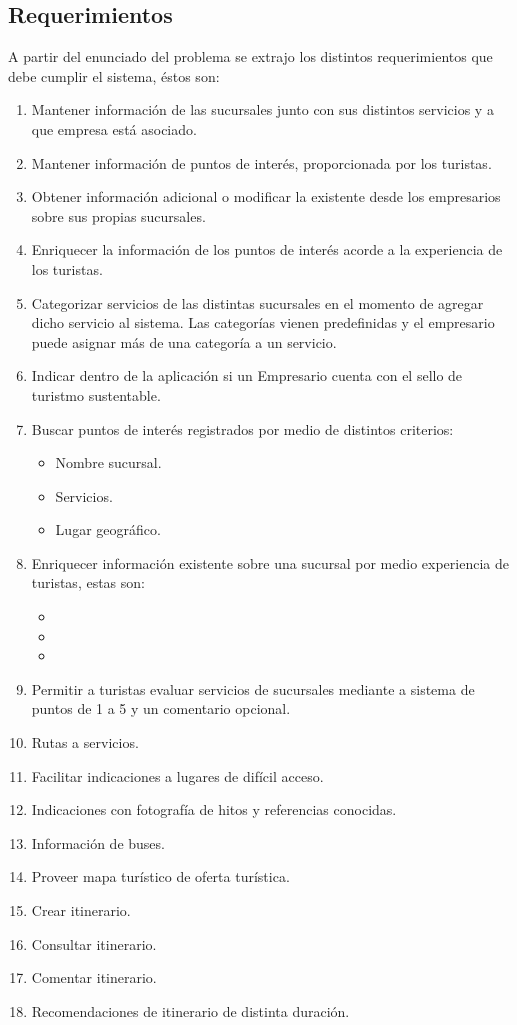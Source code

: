 \documentclass[11pt]{article}
\begin{document}
\subsection{Requerimientos}
A partir del enunciado del problema se extrajo los distintos requerimientos que debe cumplir el sistema, éstos son:
\begin{enumerate}
\item Mantener información de las sucursales junto con sus distintos servicios y a que empresa está asociado.
\item Mantener información de puntos de interés,  proporcionada por los turistas.
\item Obtener información adicional o modificar la existente desde los empresarios sobre sus propias sucursales.
\item Enriquecer la información de los puntos de interés acorde a la experiencia de los turistas.
\item Categorizar servicios de las distintas sucursales en el momento de agregar dicho servicio al sistema. Las categorías vienen predefinidas y el empresario puede asignar más de una categoría a un servicio.
\item Indicar dentro de la aplicación si un Empresario cuenta con el sello de turistmo sustentable.
\item Buscar puntos de interés registrados por medio de distintos criterios:
	\begin{itemize}
		\item Nombre sucursal.
		\item Servicios.
		\item Lugar geográfico.
	\end{itemize}
\item Enriquecer información existente sobre una sucursal por medio experiencia de turistas, estas son:
	\begin{itemize}
		\item 
		\item
		\item
	\end{itemize}

\item Permitir a turistas evaluar servicios de sucursales mediante a sistema de puntos de 1 a 5 y un comentario opcional.

\item Rutas a servicios.
\item Facilitar indicaciones a lugares de difícil acceso.
\item Indicaciones con fotografía de hitos y referencias conocidas.
\item Información de buses.
\item Proveer mapa turístico de oferta turística.
\item Crear itinerario.
\item Consultar itinerario.
\item Comentar itinerario.
\item Recomendaciones de itinerario de distinta duración.
\end{enumerate}
\end{document}
